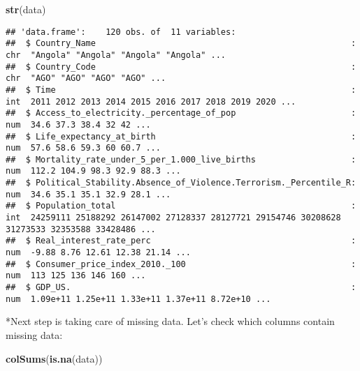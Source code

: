 \documentclass[
]{article}
\newenvironment{Shaded}{\begin{snugshade}}{\end{snugshade}}
\newcommand{\FunctionTok}[1]{\textcolor[rgb]{0.13,0.29,0.53}{\textbf{#1}}}
\newcommand{\NormalTok}[1]{#1}
\begin{document}
\begin{Shaded}
\begin{Highlighting}[]
\FunctionTok{str}\NormalTok{(data)}
\end{Highlighting}
\end{Shaded}

\begin{verbatim}
## 'data.frame':    120 obs. of  11 variables:
##  $ Country_Name                                                   : chr  "Angola" "Angola" "Angola" "Angola" ...
##  $ Country_Code                                                   : chr  "AGO" "AGO" "AGO" "AGO" ...
##  $ Time                                                           : int  2011 2012 2013 2014 2015 2016 2017 2018 2019 2020 ...
##  $ Access_to_electricity._percentage_of_pop                       : num  34.6 37.3 38.4 32 42 ...
##  $ Life_expectancy_at_birth                                       : num  57.6 58.6 59.3 60 60.7 ...
##  $ Mortality_rate_under_5_per_1.000_live_births                   : num  112.2 104.9 98.3 92.9 88.3 ...
##  $ Political_Stability.Absence_of_Violence.Terrorism._Percentile_R: num  34.6 35.1 35.1 32.9 28.1 ...
##  $ Population_total                                               : int  24259111 25188292 26147002 27128337 28127721 29154746 30208628 31273533 32353588 33428486 ...
##  $ Real_interest_rate_perc                                        : num  -9.88 8.76 12.61 12.38 21.14 ...
##  $ Consumer_price_index_2010._100                                 : num  113 125 136 146 160 ...
##  $ GDP_US.                                                        : num  1.09e+11 1.25e+11 1.33e+11 1.37e+11 8.72e+10 ...
\end{verbatim}

*Next step is taking care of missing data. Let's check which columns
contain missing data:

\begin{Shaded}
\begin{Highlighting}[]
\FunctionTok{colSums}\NormalTok{(}\FunctionTok{is.na}\NormalTok{(data))}
\end{Highlighting}
\end{Shaded}
\end{document}

